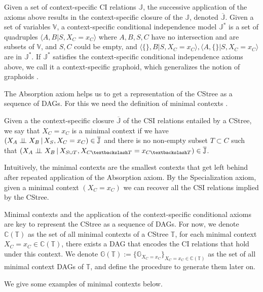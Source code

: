 \documentclass{tufte-book}
\begin{document}
Given a set of context-specific CI relations \(\mathbb{J}\), the successive application of the axioms above results in the context-specific closure  of the \(\mathbb{J}\), denoted \(\mathbb{\overline{J}}\). Given a set of variables \(\mathbb{V}\), a context-specific conditional independence model \(\mathbb{J}^*\) is a set of quadruples \(\langle A, B|S, X_C=x_C\rangle\) where \(A,B,S,C\) have no intersection and are subsets of \(\mathbb{V}\), and \(S,C\) could be empty, and \(\langle \{\},B|S,X_C=x_C\rangle, \langle A,\{\}|S,X_C=x_C\rangle\) are in \(\mathbb{J}^*\). If \(\mathbb{J}^*\) satisfies the context-specific conditional independence axioms above, we call it a context-specific graphoid, which generalizes the notion of graphoids \cite{pearl-1986-graph}.


The Absorption axiom helps us to get a representation of the CStree as a sequence of DAGs. For this we need the definition of minimal contexts \cite{duarte-2021-repres-contex}.
\begin{definition}\label{def:mcs}
Given a the context-specific closure $\mathbb{\overline{J}}$ of the CSI relations entailed by a CStree, we say that ${X_C=x_C}$ is a minimal context if we have $(X_A  \perp \!\!\! \perp X_B \,|\, X_S, X_C=x_C) \in \mathbb{\overline{J}}$ and there is no non-empty subset $T \subset C$ such that $(X_A \indep X_B \,|\, X_{S \cup T}, X_{C \textbackslash T}=x_{C\textbackslash T}) \in \mathbb{\overline{J}}$.
\end{definition}

Intuitively, the minimal contexts are the smallest contexts that get left behind after repeated application of the Absorption axiom. By the Specialization axiom, given a minimal context \((X_C=x_C)\) we can recover all the CSI relations implied by the CStree.

Minimal contexts and the application of the context-specific conditional axioms are key to represent the CStree as a sequence of DAGs. For now, we denote \(\mathbb{C}(\mathbb{T})\) as the set of all minimal contexts of a CStree \(\mathbb{T}\), for each minimal context \(X_C=x_C \in \mathbb{C}(\mathbb{T})\), there exists a DAG that encodes the CI relations that hold under this context.  We denote \(\mathbb{G}(\mathbb{T}) := \{ \mathbb{G}_{X_C=x_C} \}_{X_C=x_C \in \mathbb{C}(\mathbb{T})}\) as the set of all minimal context DAGs of \(\mathbb{T}\), and define the procedure to generate them later on.


We give some examples of minimal contexts below.
\end{document}
